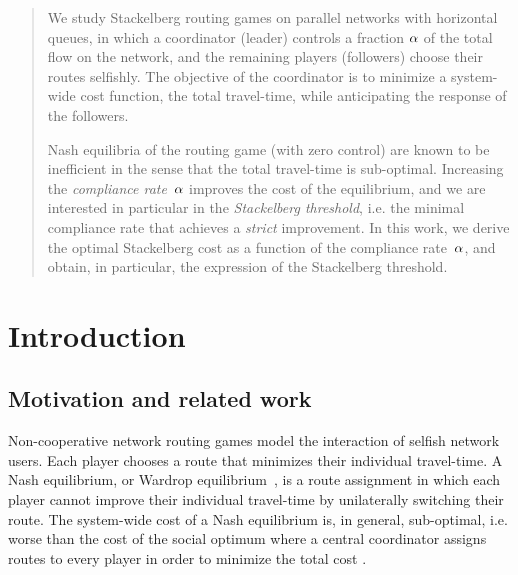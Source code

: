 
\begin{abstract}
We study Stackelberg routing games on parallel networks with horizontal queues, in which a coordinator (leader) controls a fraction $\alpha$ of the total flow on the network, and the remaining players (followers) choose their routes selfishly. The objective of the coordinator is to minimize a system-wide cost function, the total travel-time, while anticipating the response of the followers. 

Nash equilibria of the routing game (with zero control) are known to be inefficient in the sense that the total travel-time is sub-optimal. Increasing the \emph{compliance rate}~$\alpha$ improves the cost of the equilibrium, and we are interested in particular in the \emph{Stackelberg threshold}, i.e. the minimal compliance rate that achieves a \emph{strict} improvement. In this work, we derive the optimal Stackelberg cost as a function of the compliance rate~$\alpha$, and obtain, in particular, the expression of the Stackelberg threshold.
\end{abstract}


\section{Introduction}
\label{sec:intro}

\subsection{Motivation and related work}

Non-cooperative network routing games model the interaction of selfish network users. Each player chooses a route that  minimizes their individual travel-time. A Nash equilibrium, or Wardrop equilibrium~\cite{wardrop1952some}, is a route assignment in which each player cannot improve their individual travel-time by unilaterally switching their route. The system-wide cost of a Nash equilibrium is, in general, sub-optimal, i.e. worse than the cost of the social optimum where a central coordinator assigns routes to every player in order to minimize the total cost \cite{roughgarden2002bad}.

